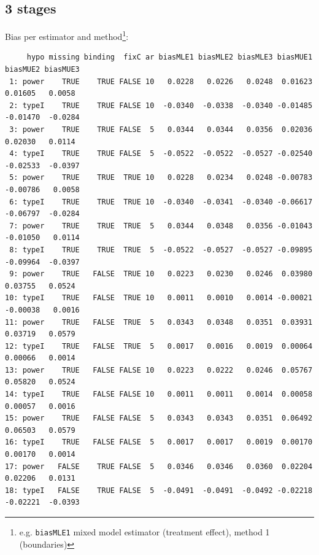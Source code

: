 \documentclass[12pt]{article}
\begin{document}
\subsection{3 stages}
\label{sec:org8489248}
Bias per estimator and method\footnote{e.g. \texttt{biasMLE1} mixed model
estimator (treatment effect), method 1 (boundaries)}:
\begin{adjustwidth}{-1cm}{-1cm}
\begin{verbatim}
     hypo missing binding  fixC ar biasMLE1 biasMLE2 biasMLE3 biasMUE1 biasMUE2 biasMUE3
 1: power    TRUE    TRUE FALSE 10   0.0228   0.0226   0.0248  0.01623  0.01605   0.0058
 2: typeI    TRUE    TRUE FALSE 10  -0.0340  -0.0338  -0.0340 -0.01485 -0.01470  -0.0284
 3: power    TRUE    TRUE FALSE  5   0.0344   0.0344   0.0356  0.02036  0.02030   0.0114
 4: typeI    TRUE    TRUE FALSE  5  -0.0522  -0.0522  -0.0527 -0.02540 -0.02533  -0.0397
 5: power    TRUE    TRUE  TRUE 10   0.0228   0.0234   0.0248 -0.00783 -0.00786   0.0058
 6: typeI    TRUE    TRUE  TRUE 10  -0.0340  -0.0341  -0.0340 -0.06617 -0.06797  -0.0284
 7: power    TRUE    TRUE  TRUE  5   0.0344   0.0348   0.0356 -0.01043 -0.01050   0.0114
 8: typeI    TRUE    TRUE  TRUE  5  -0.0522  -0.0527  -0.0527 -0.09895 -0.09964  -0.0397
 9: power    TRUE   FALSE  TRUE 10   0.0223   0.0230   0.0246  0.03980  0.03755   0.0524
10: typeI    TRUE   FALSE  TRUE 10   0.0011   0.0010   0.0014 -0.00021 -0.00038   0.0016
11: power    TRUE   FALSE  TRUE  5   0.0343   0.0348   0.0351  0.03931  0.03719   0.0579
12: typeI    TRUE   FALSE  TRUE  5   0.0017   0.0016   0.0019  0.00064  0.00066   0.0014
13: power    TRUE   FALSE FALSE 10   0.0223   0.0222   0.0246  0.05767  0.05820   0.0524
14: typeI    TRUE   FALSE FALSE 10   0.0011   0.0011   0.0014  0.00058  0.00057   0.0016
15: power    TRUE   FALSE FALSE  5   0.0343   0.0343   0.0351  0.06492  0.06503   0.0579
16: typeI    TRUE   FALSE FALSE  5   0.0017   0.0017   0.0019  0.00170  0.00170   0.0014
17: power   FALSE    TRUE FALSE  5   0.0346   0.0346   0.0360  0.02204  0.02206   0.0131
18: typeI   FALSE    TRUE FALSE  5  -0.0491  -0.0491  -0.0492 -0.02218 -0.02221  -0.0393
\end{verbatim}
\end{adjustwidth}
\end{document}
